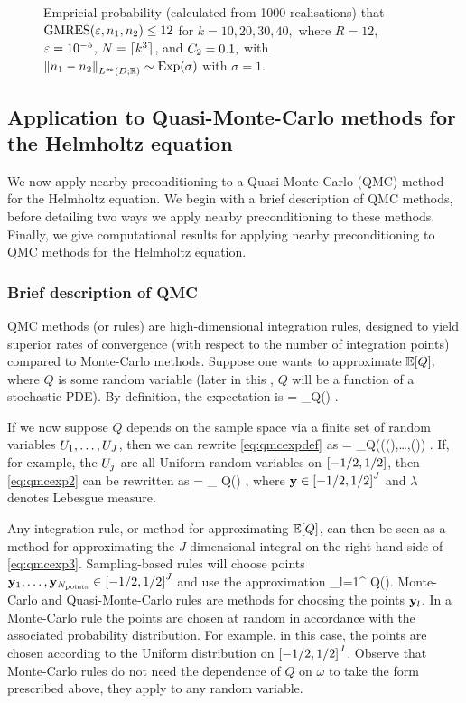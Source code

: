 \begin{figure}[h]
    \centering

\caption{Empricial probability (calculated from 1000 realisations) that $\GMRES{\eps}{\no}{\nt}\leq 12$ for $k = 10, 20, 30, 40,$ where $R=12$, $\varepsilon = 10^{-5}$, $N = \lceil k^{3}\rceil$, and $C_{2}=0.1,$ with $\NLiDRR{\no-\nt} \sim \Exp{\sigma}$ with $\sigma = 1.$\label{fig:prob-plot-2.0}}
\end{figure}


\subsection{Application to Quasi-Monte-Carlo methods for the Helmholtz equation}\label{sec:nbpcqmc}

We now apply nearby preconditioning to a Quasi-Monte-Carlo (QMC) method for the Helmholtz equation. We begin with a brief description of QMC methods, before detailing two ways we apply nearby preconditioning to these methods. Finally, we give computational results for applying nearby preconditioning to QMC methods for the Helmholtz equation.

\subsubsection{Brief description of QMC}

QMC methods (or rules) are high-dimensional integration rules, designed to yield superior rates of convergence (with respect to the number of integration points) compared to Monte-Carlo methods. Suppose one wants to approximate $\EXP{Q},$ where $Q$ is some random variable (later in this , $Q$ will be a function of a stochastic PDE). By definition, the expectation is
\beq\label{eq:qmcexpdef}
 = \int_\Omega Q(\omega) \ddPPomega.
\eeq

If we now suppose $Q$ depends on the sample space via a finite set of random variables $U_{1},\ldots,U_{J}$, then we can rewrite \cref{eq:qmcexpdef} as
\beq\label{eq:qmcexp2}
 = \int_\Omega Q\mleft((\Uo(\omega),\ldots,\UJ(\omega)\mright) \ddPPomega.
\eeq
If, for example, the $U_{j}$ are all Uniform random variables on $\mleft[-1/2,1/2\mright]$, then \cref{eq:qmcexp2} can be rewritten as
\beq\label{eq:qmcexp3}
 = \int_{} Q\mleft(\by\mright) \dd\lambda,
\eeq
where $\by \in \cube{J}$ and $\lambda$ denotes Lebesgue measure.

Any integration rule, or method for approximating $\EXP{Q}$, can then be seen as a method for approximating the $J$-dimensional integral on the right-hand side of \cref{eq:qmcexp3}. Sampling-based rules will choose points $\byo,\ldots,\byNpoints \in \cube{J}$ and use the approximation
\beqs
{} \approx {}\sum_{l=1}^{\Npoints} Q\mleft(\byl\mright).
\eeqs
Monte-Carlo and Quasi-Monte-Carlo rules are methods for choosing the points $\mathbf{y}_{l}$. In a Monte-Carlo rule the points are chosen at random in accordance with the associated probability distribution. For example, in this case, the points are chosen according to the Uniform distribution on $\cube{J}$. Observe that Monte-Carlo rules do not need the dependence of $Q$ on $\omega$ to take the form prescribed above, they apply to any random variable.

